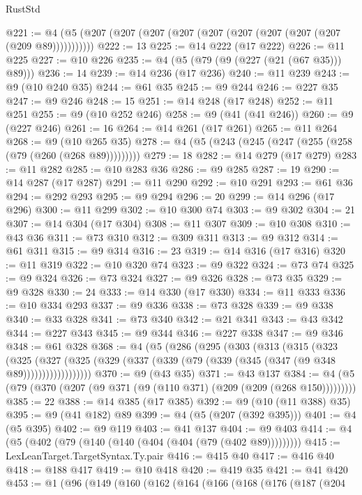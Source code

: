 \begin{lexlean}{RustStd}
\begin{coremodule}
@221 := @4 (@5 (@207 (@207 (@207 (@207 (@207 (@207 (@207 (@207 (@207 (@209 @89)))))))))))
@222 := 13
@225 := @14 @222 (@17 @222)
@226 := @11 @225
@227 := @10 @226
@235 := @4 (@5 (@79 (@9 (@227 (@21 (@67 @35))) @89)))
@236 := 14
@239 := @14 @236 (@17 @236)
@240 := @11 @239
@243 := @9 (@10 @240 @35)
@244 := @61 @35
@245 := @9 @244
@246 := @227 @35
@247 := @9 @246
@248 := 15
@251 := @14 @248 (@17 @248)
@252 := @11 @251
@255 := @9 (@10 @252 @246)
@258 := @9 (@41 (@41 @246))
@260 := @9 (@227 @246)
@261 := 16
@264 := @14 @261 (@17 @261)
@265 := @11 @264
@268 := @9 (@10 @265 @35)
@278 := @4 (@5 (@243 (@245 (@247 (@255 (@258 (@79 (@260 (@268 @89)))))))))
@279 := 18
@282 := @14 @279 (@17 @279)
@283 := @11 @282
@285 := @10 @283 @36
@286 := @9 @285
@287 := 19
@290 := @14 @287 (@17 @287)
@291 := @11 @290
@292 := @10 @291
@293 := @61 @36
@294 := @292 @293
@295 := @9 @294
@296 := 20
@299 := @14 @296 (@17 @296)
@300 := @11 @299
@302 := @10 @300 @74
@303 := @9 @302
@304 := 21
@307 := @14 @304 (@17 @304)
@308 := @11 @307
@309 := @10 @308
@310 := @43 @36
@311 := @73 @310
@312 := @309 @311
@313 := @9 @312
@314 := @61 @311
@315 := @9 @314
@316 := 23
@319 := @14 @316 (@17 @316)
@320 := @11 @319
@322 := @10 @320 @74
@323 := @9 @322
@324 := @73 @74
@325 := @9 @324
@326 := @73 @324
@327 := @9 @326
@328 := @73 @35
@329 := @9 @328
@330 := 24
@333 := @14 @330 (@17 @330)
@334 := @11 @333
@336 := @10 @334 @293
@337 := @9 @336
@338 := @73 @328
@339 := @9 @338
@340 := @33 @328
@341 := @73 @340
@342 := @21 @341
@343 := @43 @342
@344 := @227 @343
@345 := @9 @344
@346 := @227 @338
@347 := @9 @346
@348 := @61 @328
@368 := @4
    (@5
      (@286
        (@295
          (@303
            (@313
              (@315
                (@323
                  (@325
                    (@327
                      (@325 (@329 (@337 (@339 (@79 (@339 (@345 (@347 (@9 @348 @89))))))))))))))))))
@370 := @9 (@43 @35)
@371 := @43 @137
@384 := @4 (@5 (@79 (@370 (@207 (@9 @371 (@9 (@110 @371) (@209 (@209 (@268 @150)))))))))
@385 := 22
@388 := @14 @385 (@17 @385)
@392 := @9 (@10 (@11 @388) @35)
@395 := @9 (@41 @182) @89
@399 := @4 (@5 (@207 (@392 @395)))
@401 := @4 (@5 @395)
@402 := @9 @119
@403 := @41 @137
@404 := @9 @403
@414 := @4 (@5 (@402 (@79 (@140 (@140 (@404 (@404 (@79 (@402 @89)))))))))
@415 := LexLeanTarget.TargetSyntax.Ty.pair
@416 := @415 @40
@417 := @416 @40
@418 := @188 @417
@419 := @10 @418
@420 := @419 @35
@421 := @41 @420
@453 := @1
    (@96
      (@149
        (@160
          (@162
            (@164
              (@166
                (@168
                  (@176
                    (@187
                      (@204

\end{coremodule}
\end{lexlean}
